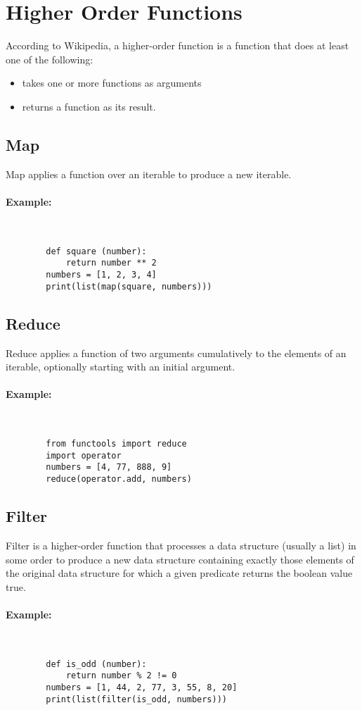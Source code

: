 \documentclass{book}
\begin{document}
    \section*{Higher Order Functions}
    According to Wikipedia, a higher-order function is a function that does at least one of the following:
    \begin{itemize}
        \item takes one or more functions as arguments
        \item returns a function as its result.
    \end{itemize}

    \subsection*{Map}
    Map applies a function over an iterable to produce a new iterable.
    \paragraph{Example:} ~
    \begin{verbatim}
        def square (number):
            return number ** 2
        numbers = [1, 2, 3, 4]
        print(list(map(square, numbers)))
    \end{verbatim}

    \subsection*{Reduce}
    Reduce applies a function of two arguments cumulatively to the elements of an iterable, optionally starting with an initial argument.
    \paragraph{Example:} ~

    \begin{verbatim}
        from functools import reduce
        import operator
        numbers = [4, 77, 888, 9]
        reduce(operator.add, numbers)
    \end{verbatim}

    \subsection*{Filter}
    Filter is a higher-order function that processes a data structure (usually a list) in some order to produce a new data structure containing exactly those elements of the original data structure for which a given predicate returns the boolean value true.
    
    \paragraph{Example:} ~

    \begin{verbatim}
        def is_odd (number):
            return number % 2 != 0
        numbers = [1, 44, 2, 77, 3, 55, 8, 20]
        print(list(filter(is_odd, numbers)))
    \end{verbatim}
\end{document}
